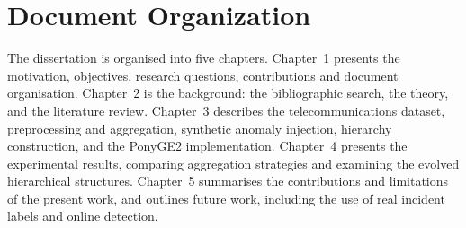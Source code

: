 \section{Document Organization}

The dissertation is organised into five chapters.
Chapter~1 presents the motivation, objectives, research questions, contributions and document organisation.
Chapter~2 is the background: the bibliographic search, the theory, and the literature review.
Chapter~3 describes the telecommunications dataset, preprocessing and aggregation, synthetic anomaly injection, hierarchy construction, and the PonyGE2 implementation.
Chapter~4 presents the experimental results, comparing aggregation strategies and examining the evolved hierarchical structures.
Chapter~5 summarises the contributions and limitations of the present work, and outlines future work, including the use of real incident labels and online detection.

